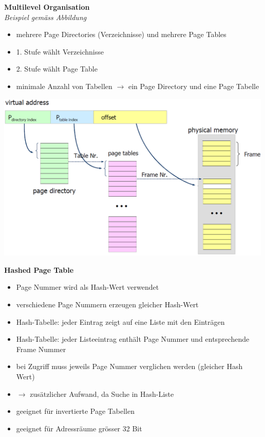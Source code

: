 \documentclass{report}
\newenvironment{Figure}
	{\par\medskip\noindent\minipage{\linewidth}}
	{\endminipage\par\medskip}
\theoremstyle{definition}
\theoremstyle{example}
\begin{document}
\textbf{Multilevel Organisation}\\
\textit{Beispiel gemäss Abbildung}
\begin{itemize}
	\item mehrere Page Directories (Verzeichnisse) und mehrere Page Tables
	\item 1. Stufe wählt Verzeichnisse
	\item 2. Stufe wählt Page Table
	\item minimale Anzahl von Tabellen $\rightarrow$ ein Page Directory und eine Page Tabelle
\end{itemize}

\begin{Figure}
\centering
\includegraphics[width=500px]{img/MultilevelOrganisation.png}
	\label{fig:Abbildung einer Multilevel Organisation}
\end{Figure}

\textbf{Hashed Page Table}

\begin{itemize}
	\item Page Nummer wird als Hash-Wert verwendet
	\item verschiedene Page Nummern erzeugen gleicher Hash-Wert
	\item Hash-Tabelle: jeder Eintrag zeigt auf eine Liste mit den Einträgen
	\item Hash-Tabelle: jeder Listeeintrag enthält Page Nummer und entsprechende Frame Nummer
	\item bei Zugriff muss jeweils Page Nummer verglichen werden (gleicher Hash Wert)
	\item $\rightarrow$ zusätzlicher Aufwand, da Suche in Hash-Liste
	\item geeignet für invertierte Page Tabellen
	\item geeignet für Adressräume grösser 32 Bit
\end{itemize}
\end{document}
